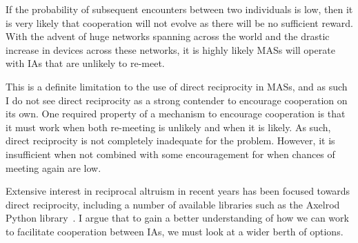 \documentclass[]{final_report}
\begin{document}
If the probability of subsequent encounters between two individuals is low, then it is very likely that cooperation will not evolve as there will be no sufficient reward. With the advent of huge networks spanning across the world and the drastic increase in devices across these networks, it is highly likely MASs will operate with IAs that are unlikely to re-meet.\par
This is a definite limitation to the use of direct reciprocity in MASs, and as such I do not see direct reciprocity as a strong contender to encourage cooperation on its own. One required property of a mechanism to encourage cooperation is that it must work when both re-meeting is unlikely and when it is likely. As such, direct reciprocity is not completely inadequate for the problem. However, it is insufficient when not combined with some encouragement for when chances of meeting again are low.\par
Extensive interest in reciprocal altruism in recent years has been focused towards direct reciprocity, including a number of available libraries such as the Axelrod Python library~\cite{axelrodproject}. I argue that to gain a better understanding of how we can work to facilitate cooperation between IAs,  we must look at a wider berth of options.
\end{document}
